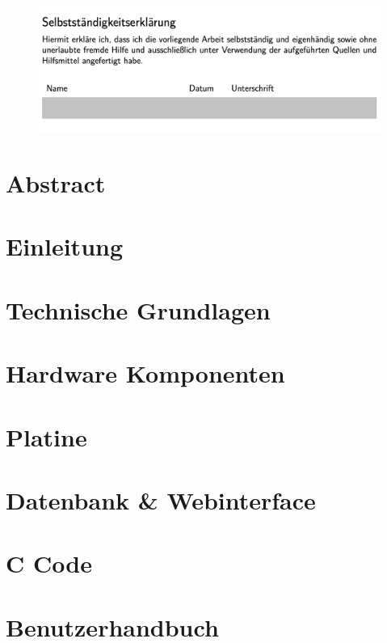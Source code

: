 \documentclass[a4paper,oneside,12pt,titlepage]{scrartcl}   %
\begin{document}
\newpage
\begin{figure}[H]
\centering
\includegraphics[width=1\textwidth]{img/alles-ich.png}
\end{figure}

\newpage

\section*{Abstract}

\newpage
\tableofcontents
\newpage
\listoffigures
\newpage
\listoftables
\newpage

\section{Einleitung}

\newpage
\section{Technische Grundlagen}

\newpage
\section{Hardware Komponenten}

\newpage
\section{Platine}

\newpage
\section{Datenbank \& Webinterface}

\newpage
\section{C Code}

\newpage
\section{Benutzerhandbuch}

\newpage
\end{document}
